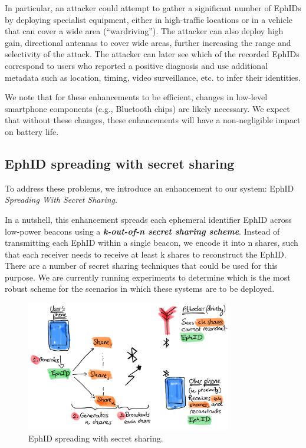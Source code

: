 \documentclass{article}
\begin{document}
In particular, an attacker could attempt to gather a significant number
of EphIDs by deploying specialist equipment, either in high-traffic
locations or in a vehicle that can cover a wide area (``wardriving'').
The attacker can also deploy high gain, directional antennas to cover
wide areas, further increasing the range and selectivity of the attack.
The attacker can later see which of the recorded EphIDs correspond to
users who reported a positive diagnosis and use additional metadata such
as location, timing, video surveillance, etc. to infer their identities.

We note that for these enhancements to be efficient, changes in
low-level smartphone components (e.g., Bluetooth chips) are likely
necessary. We expect that without these changes, these enhancements will
have a non-negligible impact on battery life.


\subsection{EphID spreading with secret sharing}\label{ephid-spreading-with-secret-sharing}

To address these problems, we introduce an enhancement to our system:
EphID \emph{Spreading With Secret Sharing}.

In a nutshell, this enhancement spreads each ephemeral identifier EphID
across low-power beacons using a \emph{\textbf{k-out-of-n secret sharing
scheme}}. Instead of transmitting each EphID within a single beacon, we
encode it into n shares, such that each receiver needs to receive at
least k shares to reconstruct the EphID. There are a number of secret
sharing techniques that could be used for this purpose. We are currently
running experiments to determine which is the most robust scheme for the
scenarios in which these systems are to be deployed.

\begin{figure}\centering
\includegraphics[width=0.8\textwidth]{figs/ephid_spreading.png}
\caption{EphID spreading with secret sharing.}
\end{figure}
\end{document}

